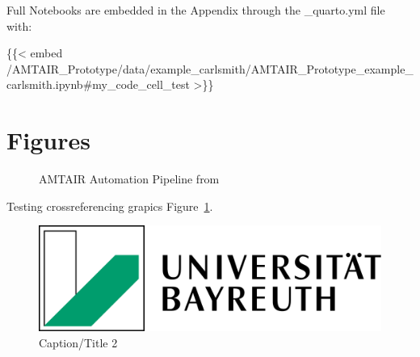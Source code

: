 \documentclass[
  11pt,
  letterpaper,
]{book}
\newenvironment{Shaded}{\begin{snugshade}}{\end{snugshade}}
\newcommand{\NormalTok}[1]{\textcolor[rgb]{0.00,0.23,0.31}{#1}}
\begin{document}
Full Notebooks are embedded in the Appendix through the \_quarto.yml
file with:

\begin{Shaded}
\begin{Highlighting}[]
\NormalTok{\{\{\textless{} embed /AMTAIR\_Prototype/data/example\_carlsmith/AMTAIR\_Prototype\_example\_carlsmith.ipynb\#my\_code\_cell\_test \textgreater{}\}\}}
\end{Highlighting}
\end{Shaded}

\section*{Figures}\label{sec-figures1}


\begin{figure}


\caption[Five-step AMTAIR automation pipeline from PDFs to Bayesian
networks]{\label{fig-automation_pipeline}AMTAIR Automation Pipeline from
\textcite{bucknall2022}}

\end{figure}%

Testing crossreferencing grapics Figure~\ref{fig-automation_pipeline}.

\begin{figure}

\includegraphics[width=0.3\linewidth,height=\textheight,keepaspectratio]{images/cover.png}

\caption[Short 2 caption]{\label{fig-testgraphic2}Caption/Title 2}

\end{figure}%
\end{document}
